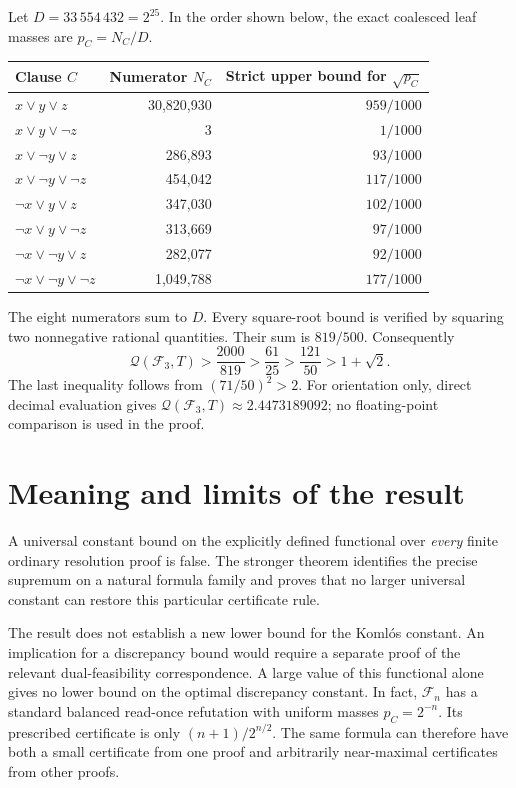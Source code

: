 \documentclass[11pt]{article}
\newcommand{\Q}{\mathcal Q}\newcommand{\F}{\mathcal F}
\begin{document}
Let $D=33\,554\,432=2^{25}$. In the order shown below, the exact coalesced leaf masses are $p_C=N_C/D$.
\begin{center}
\begin{tabular}{lrr}
\toprule
Clause $C$ & Numerator $N_C$ & Strict upper bound for $\sqrt{p_C}$\\
\midrule
$x\vee y\vee z$ & 30,820,930 & $959/1000$\\
$x\vee y\vee\neg z$ & 3 & $1/1000$\\
$x\vee\neg y\vee z$ & 286,893 & $93/1000$\\
$x\vee\neg y\vee\neg z$ & 454,042 & $117/1000$\\
$\neg x\vee y\vee z$ & 347,030 & $102/1000$\\
$\neg x\vee y\vee\neg z$ & 313,669 & $97/1000$\\
$\neg x\vee\neg y\vee z$ & 282,077 & $92/1000$\\
$\neg x\vee\neg y\vee\neg z$ & 1,049,788 & $177/1000$\\
\bottomrule
\end{tabular}
\end{center}
The eight numerators sum to $D$. Every square-root bound is verified by squaring two nonnegative rational quantities. Their sum is $819/500$. Consequently
\[
 \Q(\F_3,T)>\frac{2000}{819}>\frac{61}{25}>
 \frac{121}{50}>1+\sqrt2.
\]
The last inequality follows from $(71/50)^2>2$. For orientation only, direct decimal evaluation gives $\Q(\F_3,T)\approx2.4473189092$; no floating-point comparison is used in the proof.

\section{Meaning and limits of the result}\label{sec:limits}
A universal constant bound on the explicitly defined functional over \emph{every} finite ordinary resolution proof is false. The stronger theorem identifies the precise supremum on a natural formula family and proves that no larger universal constant can restore this particular certificate rule.

The result does not establish a new lower bound for the Koml\'os constant. An implication for a discrepancy bound would require a separate proof of the relevant dual-feasibility correspondence. A large value of this functional alone gives no lower bound on the optimal discrepancy constant. In fact, $\F_n$ has a standard balanced read-once refutation with uniform masses $p_C=2^{-n}$. Its prescribed certificate is only $(n+1)/2^{n/2}$. The same formula can therefore have both a small certificate from one proof and arbitrarily near-maximal certificates from other proofs.
\end{document}
